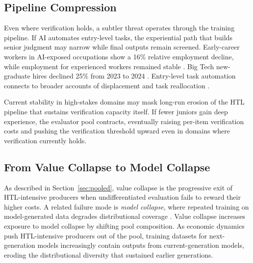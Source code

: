 \documentclass{article}
\theoremstyle{plain}
\theoremstyle{definition}
\theoremstyle{remark}
\begin{document}
\vspace{1pt}

\subsection{Pipeline Compression}
\label{sec:pipeline}

Even where verification holds, a subtler threat operates through the training pipeline. If AI automates entry-level tasks, the experiential path that builds senior judgment may narrow while final outputs remain screened. Early-career workers in AI-exposed occupations show a 16\% relative employment decline, while employment for experienced workers remained stable \citep{brynjolfsson2025canaries}. Big Tech new-graduate hires declined 25\% from 2023 to 2024 \citep{signalfire2025talent}. Entry-level task automation connects to broader accounts of displacement and task reallocation \citep{brynjolfsson2025canaries, hazra2025position, 10.1257/jep.33.2.3}.

Current stability in high-stakes domains may mask long-run erosion of the HTL pipeline that sustains verification capacity itself. If fewer juniors gain deep experience, the evaluator pool contracts, eventually raising per-item verification costs and pushing the verification threshold upward even in domains where verification currently holds.

\vspace{1pt}

\subsection{From Value Collapse to Model Collapse}
\label{sec:collapse}

\vspace{1pt}

As described in Section~\ref{sec:pooled}, value collapse is the progressive exit of HTL-intensive producers when undifferentiated evaluation fails to reward their higher costs. A related failure mode is \emph{model collapse}, where repeated training on model-generated data degrades distributional coverage \citep{shumailov2024curserecursiontraininggenerated, alemohammad2024selfconsuming, schaeffer2025positionmodelcollapsedoes}. Value collapse increases exposure to model collapse by shifting pool composition. As economic dynamics push HTL-intensive producers out of the pool, training datasets for next-generation models increasingly contain outputs from current-generation models, eroding the distributional diversity that sustained earlier generations.
\end{document}
